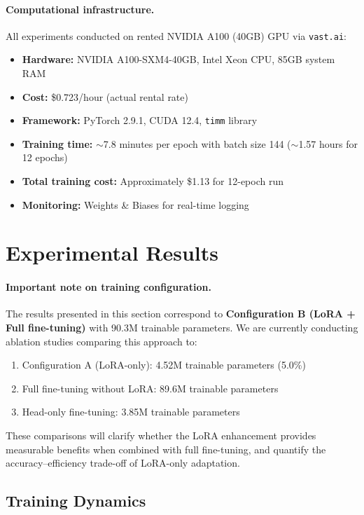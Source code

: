 \documentclass[11pt]{article}
\begin{document}
\paragraph{Computational infrastructure.}
All experiments conducted on rented NVIDIA A100 (40GB) GPU via \texttt{vast.ai}:
\begin{itemize}
    \item \textbf{Hardware:} NVIDIA A100-SXM4-40GB, Intel Xeon CPU, 85GB system RAM
    \item \textbf{Cost:} \$0.723/hour (actual rental rate)
    \item \textbf{Framework:} PyTorch 2.9.1, CUDA 12.4, \texttt{timm} library
    \item \textbf{Training time:} $\sim$7.8 minutes per epoch with batch size 144 ($\sim$1.57 hours for 12 epochs)
    \item \textbf{Total training cost:} Approximately \$1.13 for 12-epoch run
    \item \textbf{Monitoring:} Weights \& Biases for real-time logging
\end{itemize}

\section{Experimental Results}

\paragraph{Important note on training configuration.}
The results presented in this section correspond to \textbf{Configuration B (LoRA + Full fine-tuning)} with 90.3M trainable parameters. We are currently conducting ablation studies comparing this approach to:
\begin{enumerate}
    \item Configuration A (LoRA-only): 4.52M trainable parameters (5.0\%)
    \item Full fine-tuning without LoRA: 89.6M trainable parameters
    \item Head-only fine-tuning: 3.85M trainable parameters
\end{enumerate}

These comparisons will clarify whether the LoRA enhancement provides measurable benefits when combined with full fine-tuning, and quantify the accuracy--efficiency trade-off of LoRA-only adaptation.

\subsection{Training Dynamics}
\end{document}
